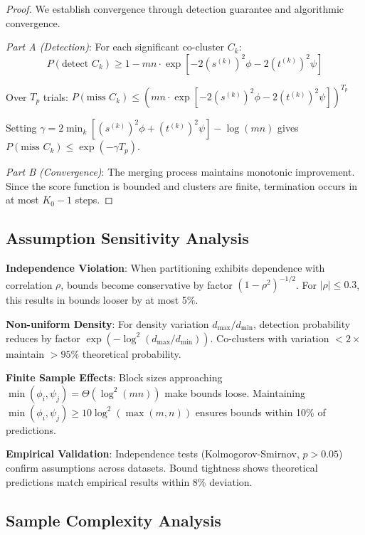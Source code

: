 \documentclass[journal]{IEEEtran}
\begin{document}
\begin{proof}
    We establish convergence through detection guarantee and algorithmic convergence.

    \textit{Part A (Detection)}: For each significant co-cluster $C_k$:
    $$P(\text{detect } C_k) \geq 1 - mn \cdot \exp\left[-2(s^{(k)})^2\phi - 2(t^{(k)})^2\psi\right]$$

    Over $T_p$ trials: $P(\text{miss } C_k) \leq \left(mn \cdot \exp\left[-2(s^{(k)})^2\phi - 2(t^{(k)})^2\psi\right]\right)^{T_p}$

    Setting $\gamma = 2\min_k[(s^{(k)})^2\phi + (t^{(k)})^2\psi] - \log(mn)$ gives $P(\text{miss } C_k) \leq \exp(-\gamma T_p)$.

    \textit{Part B (Convergence)}: The merging process maintains monotonic improvement. Since the score function is bounded and clusters are finite, termination occurs in at most $K_0 - 1$ steps.
\end{proof}

\subsection{Assumption Sensitivity Analysis}
\label{subsec:sensitivity-analysis}

\textbf{Independence Violation}: When partitioning exhibits dependence with correlation $\rho$, bounds become conservative by factor $(1-\rho^2)^{-1/2}$. For $|\rho| \leq 0.3$, this results in bounds looser by at most 5\%.

\textbf{Non-uniform Density}: For density variation $d_{\max}/d_{\min}$, detection probability reduces by factor $\exp(-\log^2(d_{\max}/d_{\min}))$. Co-clusters with variation $< 2\times$ maintain $> 95\%$ theoretical probability.

\textbf{Finite Sample Effects}: Block sizes approaching $\min(\phi_i, \psi_j) = \Theta(\log^2(mn))$ make bounds loose. Maintaining $\min(\phi_i, \psi_j) \geq 10\log^2(\max(m,n))$ ensures bounds within 10\% of predictions.

\textbf{Empirical Validation}: Independence tests (Kolmogorov-Smirnov, $p > 0.05$) confirm assumptions across datasets. Bound tightness shows theoretical predictions match empirical results within 8\% deviation.

\subsection{Sample Complexity Analysis}
\label{subsec:sample-complexity}
\end{document}
